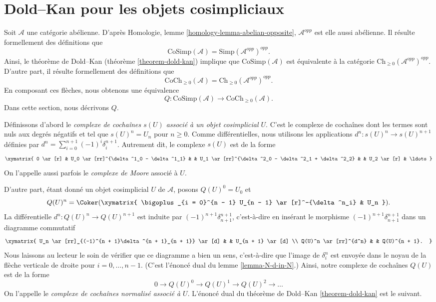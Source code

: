 \section{Dold--Kan pour les objets cosimpliciaux}
\label{section-dold-kan-cosimplicial}

\noindent
Soit $\mathcal{A}$ une catégorie abélienne.
D'après Homologie, lemme \ref{homology-lemma-abelian-opposite},
$\mathcal{A}^{opp}$ est elle aussi abélienne. Il résulte
formellement des définitions que
$$
\text{CoSimp}(\mathcal{A}) = \text{Simp}(\mathcal{A}^{opp})^{opp}.
$$
Ainsi, le théorème de Dold--Kan
(théorème \ref{theorem-dold-kan})
implique que $\text{CoSimp}(\mathcal{A})$ est équivalente à
la catégorie
$\text{Ch}_{\geq 0}(\mathcal{A}^{opp})^{opp}$. D'autre part, il
résulte formellement des définitions que
$$
\text{CoCh}_{\geq 0}(\mathcal{A}) =
\text{Ch}_{\geq 0}(\mathcal{A}^{opp})^{opp}.
$$
En composant ces flèches, nous obtenons une équivalence
$$
Q :
\text{CoSimp}(\mathcal{A})
\longrightarrow
\text{CoCh}_{\geq 0}(\mathcal{A}).
$$
Dans cette section, nous décrivons $Q$.

\medskip\noindent
Définissons d'abord le
{\it complexe de cochaînes $s(U)$ associé à un objet
cosimplicial $U$}. C'est le complexe de cochaînes dont les termes sont
nuls aux degrés négatifs et tel que $s(U)^n = U_n$ pour $n \geq 0$.
Comme différentielles, nous utilisons les applications
$d^n : s(U)^n \to s(U)^{n + 1}$ définies par
$d^n = \sum_{i = 0}^{n + 1} (-1)^i \delta^{n + 1}_i$.
Autrement dit, le complexe $s(U)$ est de la forme
$$
\xymatrix{
0 \ar[r] &
U_0 \ar[rr]^{\delta^1_0 - \delta^1_1} & &
U_1 \ar[rr]^{\delta^2_0 - \delta^2_1 + \delta^2_2} & &
U_2 \ar[r] &
\ldots
}
$$
On l'appelle aussi parfois le {\it complexe de Moore} associé
à $U$.

\medskip\noindent
D'autre part, étant donné un objet
cosimplicial $U$ de $\mathcal{A}$, posons
$Q(U)^0 = U_0$ et
$$
Q(U)^n = \Coker(
\xymatrix{
\bigoplus_{i = 0}^{n - 1} U_{n - 1} \ar[r]^-{\delta^n_i} &
U_n
}).
$$
La différentielle $d^n : Q(U)^n \to Q(U)^{n + 1}$
est induite par $(-1)^{n + 1}\delta^{n + 1}_{n + 1}$, c'est-à-dire
en insérant le morphisme
$(-1)^{n + 1}\delta^{n + 1}_{n + 1}$
dans un diagramme
commutatif
$$
\xymatrix{
U_n \ar[rr]_{(-1)^{n + 1}\delta^{n + 1}_{n + 1}} \ar[d] & &
U_{n + 1} \ar[d] \\
Q(U)^n \ar[rr]^{d^n} & &
Q(U)^{n + 1}.
}
$$
Nous laissons au lecteur le soin de vérifier que ce diagramme a bien
un sens, c'est-à-dire que l'image de $\delta^n_i$ est envoyée dans
le noyau de la flèche verticale de droite pour $i = 0, \ldots, n - 1$.
(C'est l'énoncé dual du lemme \ref{lemma-N-d-in-N}.)
Ainsi, notre complexe de cochaînes $Q(U)$ est de la forme
$$
0 \to Q(U)^0 \to Q(U)^1 \to Q(U)^2 \to \ldots
$$
On l'appelle le {\it complexe de cochaînes normalisé associé
à $U$}.
L'énoncé dual du théorème de Dold--Kan \ref{theorem-dold-kan} est le suivant.

